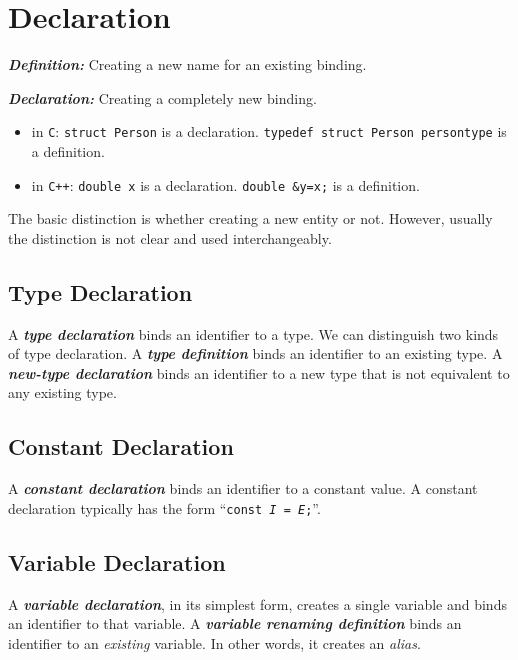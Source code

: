 \section{Declaration}
\label{sec:declaration}

\textit{\textbf{Definition:}} Creating a new name for an existing binding.

\noindent \textit{\textbf{Declaration:}} Creating a completely new binding.

\begin{itemize}
  \item in \texttt{C}: \texttt{struct Person} is a declaration. \texttt{typedef struct Person persontype} is a definition.
  \item in \texttt{C++}: \texttt{double x} is a declaration. \texttt{double \&y=x;} is a definition.
\end{itemize}

The basic distinction is whether creating a new entity or not. However, usually the distinction is not clear and used interchangeably.

\subsection{Type Declaration}

A \textit{\textbf{type declaration}} binds an identifier to a type. We can distinguish two kinds of type declaration. A \textit{\textbf{type definition}} binds an identifier to an existing type. A \textit{\textbf{new-type declaration}} binds an identifier to a new type that is not equivalent to any existing type.

\subsection{Constant Declaration}

A \textit{\textbf{constant declaration}} binds an identifier to a constant value. A constant declaration typically has the form ``\texttt{const \textit{I} = \textit{E};}''.

\subsection{Variable Declaration}

A \textit{\textbf{variable declaration}}, in its simplest form, creates a single variable and binds an identifier to that variable. A \textit{\textbf{variable renaming definition}} binds an identifier to an \textit{existing} variable. In other words, it creates an \textit{alias}.

